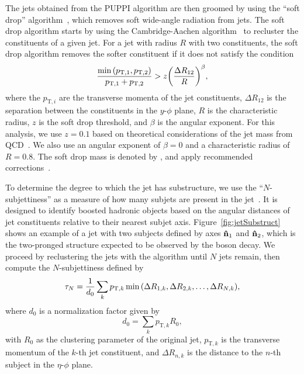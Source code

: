 The jets obtained from the PUPPI algorithm are then groomed by using the ``soft drop'' algorithm~\cite{Larkoski_2014}, which removes soft wide-angle radiation from jets.
The soft drop algorithm starts by using the Cambridge-Aachen algorithm~\cite{Dokshitzer_1997,Wobisch:393035} to recluster the constituents of a given jet.
For a jet with radius $R$ with two constituents, the soft drop algorithm removes the softer constituent if it does not satisfy the condition
\begin{equation}
  \frac{\min\pqty{p_{\mathrm{T},1},p_{\mathrm{T},2}}}{p_{\mathrm{T},1}+p_{\mathrm{T},2}}>z\pqty{\frac{\Delta R_{12}}{R}}^\beta,
\end{equation}
where the $p_{\mathrm{T},i}$ are the transverse momenta of the jet constituents, $\Delta R_{12}$ is the separation between the constituents in the $y$-$\phi$ plane, $R$ is the characteristic radius, $z$ is the soft drop threshold, and $\beta$ is the angular exponent.
For this analysis, we use $z=0.1$ based on theoretical considerations of the jet mass from QCD~\cite{Dasgupta_2013,Dasgupta_2013_2}.
We also use an angular exponent of $\beta=0$ and a characteristic radius of $R=0.8$.
The soft drop mass is denoted by \MJ, and apply recommended corrections~\cite{WZ-tagging}.

To determine the degree to which the jet has substructure, we use the ``$N$-subjettiness'' as a measure of how many subjets are present in the jet~\cite{Thaler_2011,Thaler_2012}.
It is designed to identify boosted hadronic objects based on the angular distances of jet constituents relative to their nearest subjet axis.
Figure~\ref{fig:jetSubstruct} shows an example of a jet with two subjects defined by axes $\vu{n}_1$ and $\vu{n}_2$, which is the two-pronged structure expected to be observed by the \Vhad boson decay.
We proceed by reclustering the jets with the \kt algorithm until $N$ jets remain, then compute the $N$-subjettiness defined by
\begin{equation}
  \tau_N=\frac{1}{d_0}\sum_kp_{\mathrm{T},k}\min\pqty{\Delta R_{1,k},\Delta R_{2,k},\ldots,\Delta R_{N,k}},
\end{equation}
where $d_0$ is a normalization factor given by
\begin{equation}
  d_0=\sum_kp_{\mathrm{T},k}R_0,
\end{equation}
with $R_0$ as the clustering parameter of the original jet, $p_{\mathrm{T},k}$ is the transverse momentum of the $k$-th jet constituent, and $\Delta R_{n,k}$ is the distance to the $n$-th subject in the $\eta$-$\phi$ plane.

